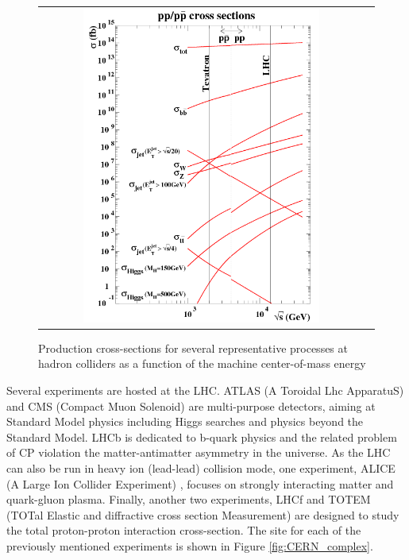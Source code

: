 \begin{figure}[tbh!]
	\centering
	\begin{tabular}{cc}
		\includegraphics[width=0.75\textwidth]{detector/pics/LHC_xsec.png}
	\end{tabular}
	\caption{Production cross-sections for several representative processes at hadron colliders as a function of the machine center-of-mass energy}
	\label{fig:LHC_xsec}
\end{figure}


Several experiments are hosted at the LHC. ATLAS (A Toroidal Lhc ApparatuS) \cite{det::ATLAS} and CMS (Compact Muon Solenoid) \cite{Chatrchyan:2008zzk} are multi-purpose detectors, aiming at Standard Model physics including Higgs searches and physics beyond the Standard Model. LHCb \cite{det::LHCb} is dedicated to b-quark physics and the related problem of CP violation the matter-antimatter asymmetry in the universe. As the LHC can also be run in heavy ion (lead-lead) collision mode, one experiment, ALICE (A Large Ion Collider Experiment) \cite{det::ALICE}, focuses on strongly interacting matter and quark-gluon plasma. Finally, another two experiments, LHCf \cite{Adriani:2008zz} and TOTEM (TOTal Elastic and diffractive cross section Measurement) \cite{Anelli:2008zza} are designed to study the total proton-proton interaction cross-section. The site for each of the previously mentioned experiments is shown in Figure \ref{fig:CERN_complex}. 

